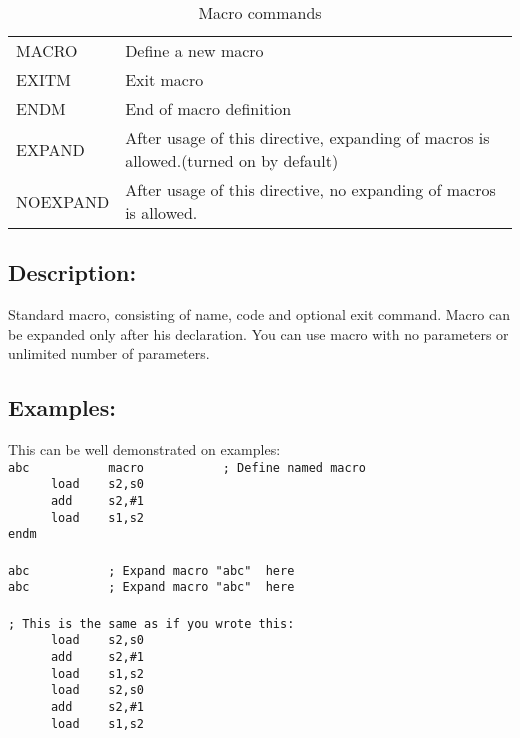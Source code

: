             \begin{table}[h!]
                \begin{tabular}{|ll|}
                    \hline
                    MACRO      & Define a new macro \\
                    EXITM      & Exit macro  \\
                    ENDM       & End of macro definition \\
                    EXPAND     & After usage of this directive, expanding of macros is allowed.(turned on by default)\\
                    NOEXPAND   & After usage of this directive, no expanding of macros is allowed.\\
                    \hline
                \end{tabular}
                \caption{Macro commands}
            \end{table}

        \subsection{Description:}
            Standard macro, consisting of name, code and optional exit command. Macro can be expanded only after his declaration. You can use macro with no parameters  or unlimited number of parameters.

        \subsection{Examples:}
            This can be well demonstrated on examples:
            {
                \usecodefont\\
                \verb'abc           macro           ; Define named macro '\\
                \verb'      load    s2,s0'\\
                \verb'      add     s2,#1'\\
                \verb'      load    s1,s2'\\
                \verb'endm'\\\\
                \verb'abc           ; Expand macro "abc"  here'\\
                \verb'abc           ; Expand macro "abc"  here'\\\\
                \verb'; This is the same as if you wrote this:'\\
                \verb'      load    s2,s0'\\
                \verb'      add     s2,#1'\\
                \verb'      load    s1,s2'\\
                \verb'      load    s2,s0'\\
                \verb'      add     s2,#1'\\
                \verb'      load    s1,s2'\\
            }

